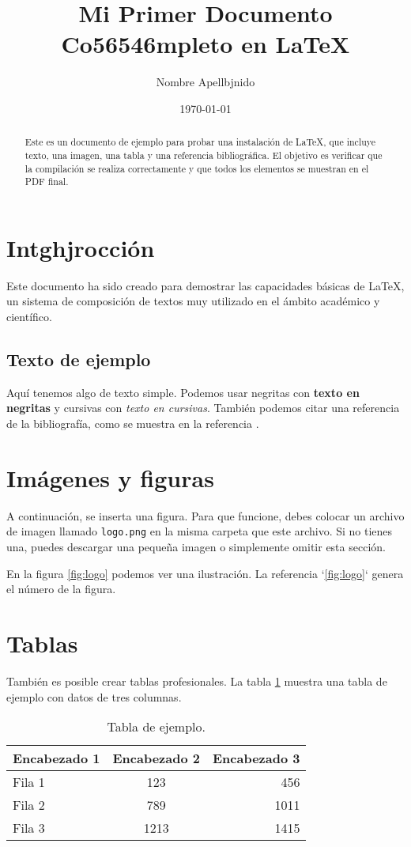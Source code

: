 \documentclass{article}
\title{Mi Primer Documento Co56546mpleto en \LaTeX}
\author{Nombre Apellbjnido}
\date{\today}
\begin{document}
\maketitle

\begin{abstract}
Este es un documento de ejemplo para probar una instalación de \LaTeX, que incluye texto, una imagen, una tabla y una referencia bibliográfica. El objetivo es verificar que la compilación se realiza correctamente y que todos los elementos se muestran en el PDF final.
\end{abstract}

\section{Intghjrocción}
Este documento ha sido creado para demostrar las capacidades básicas de \LaTeX, un sistema de composición de textos muy utilizado en el ámbito académico y científico.

\subsection{Texto de ejemplo}
Aquí tenemos algo de texto simple. Podemos usar negritas con \textbf{texto en negritas} y cursivas con \textit{texto en cursivas}. También podemos citar una referencia de la bibliografía, como se muestra en la referencia \cite{greenwade93}.

\section{Imágenes y figuras}
A continuación, se inserta una figura. Para que funcione, debes colocar un archivo de imagen llamado \texttt{logo.png} en la misma carpeta que este archivo. Si no tienes una, puedes descargar una pequeña imagen o simplemente omitir esta sección.



En la figura \ref{fig:logo} podemos ver una ilustración. La referencia `\ref{fig:logo}` genera el número de la figura.

\section{Tablas}
También es posible crear tablas profesionales. La tabla \ref{tab:ejemplo} muestra una tabla de ejemplo con datos de tres columnas.

\begin{table}[h]
    \centering
    \caption{Tabla de ejemplo.}
    \label{tab:ejemplo}
    \begin{tabular}{lcr}
        \toprule
        Encabezado 1 & Encabezado 2 & Encabezado 3 \\
        \midrule
        Fila 1 & 123 & 456 \\
        Fila 2 & 789 & 1011 \\
        Fila 3 & 1213 & 1415 \\
        \bottomrule
    \end{tabular}
\end{table}
\end{document}
